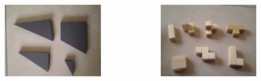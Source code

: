 \documentclass[dutch]{beamer}
\begin{document}
\begin{frame}
\begin{columns}
        \begin{column}{0.4\textwidth}
        \begin{figure}[h]
\includegraphics[height=5cm]{PIC0135}%
\end{figure}
\end{column}
\begin{column}{0.4\textwidth}
      
        \begin{figure}[h]
\includegraphics[height=5cm]{PIC0137}%
\end{figure}
    \end{column}
  \end{columns}  
\end{frame}
\end{document}
